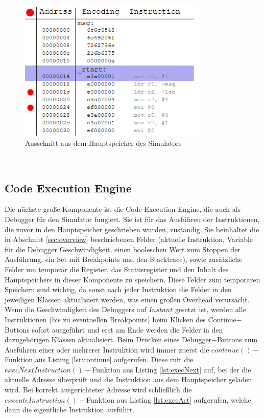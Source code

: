 \documentclass[a4paper, 11pt, onecolumn]{article}
\begin{document}
\begin{figure}[!htb]
\centering
\includegraphics[width=0.8\textwidth]{data/memory}
\caption[Adresszeilen]{Ausschnitt aus dem Hauptspeicher des Simulators}
\label{fig:memory}
\end{figure}
~\\
\subsection{Code Execution Engine}\label{sec:codeExecEngine}

Die nächste große Komponente ist die Code Execution Engine, die auch als Debugger für den Simulator fungiert. Sie ist für das Ausführen der Instruktionen, die zuvor in den Hauptspeicher geschrieben wurden, zuständig. Sie beinhaltet die in Abschnitt \ref{sec:overview} beschriebenen Felder (aktuelle Instruktion, Variable für die Debugger Geschwindigkeit, einen booleschen Wert zum Stoppen der Ausführung, ein Set mit Breakpoints und den Stacktrace), sowie zusätzliche Felder um temporär die Register, das Statusregister und den Inhalt des Hauptspeichers in dieser Komponente zu speichern. Diese Felder zum temporären Speichern sind wichtig, da sonst nach jeder Instruktion die Felder in den jeweiligen Klassen aktualisiert werden, was einen großen Overhead verursacht. Wenn die Geschwindigkeit des Debuggers auf $Instant$ gesetzt ist, werden alle Instruktionen (bis zu eventuellen Breakpoints) beim Klicken des Continue$-$Buttons sofort ausgeführt und erst am Ende werden die Felder in den dazugehörigen Klassen aktualisiert. Beim Drücken eines Debugger$-$Buttons zum Ausführen einer oder mehrerer Instruktion wird immer zuerst die $continue()-$Funktion aus Listing \ref{lst:continue} aufgerufen. Diese ruft die  $execNextInstruction()-$Funktion aus Listing \ref{lst:execNext} auf, bei der die aktuelle Adresse überprüft und die Instruktion aus dem Hauptspeicher geladen wird. Bei korrekt ausgerichteter Adresse wird schließlich die $executeInstruction()-$Funktion aus Listing \ref{lst:execAct} aufgerufen, welche dann die eigentliche Instruktion ausführt. \\ 
\end{document}
